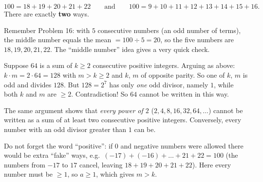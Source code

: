 {
\[100=18+19+20+21+22\qquad\text{and}\qquad 100=9+10+11+12+13+14+15+16.\]
There are exactly \textbf{two} ways.

\begin{tipbox}Remember Problem 16: with $5$ consecutive numbers (an odd number of terms), the middle number equals the mean $=100\div 5=20$, so the five numbers are $18,19,20,21,22$. The ``middle number'' idea gives a very quick check.\end{tipbox}

Suppose $64$ is a sum of $k\ge 2$ consecutive positive integers. Arguing as above: $k\cdot m=2\cdot 64=128$ with $m>k\ge 2$ and $k$, $m$ of opposite parity. So one of $k$, $m$ is odd and divides $128$. But $128=2^7$ has only \emph{one} odd divisor, namely $1$, while both $k$ and $m$ are $\ge 2$. Contradiction! So $64$ cannot be written in this way.

\begin{proofbox}The same argument shows that \emph{every power of $2$} ($2,4,8,16,32,64,\dots$) cannot be written as a sum of at least two consecutive positive integers. Conversely, every number with an odd divisor greater than $1$ can be.\end{proofbox}

\begin{warnbox}Do not forget the word ``positive'': if $0$ and negative numbers were allowed there would be extra ``fake'' ways, e.g.\ $(-17)+(-16)+\dots+21+22=100$ (the numbers from $-17$ to $17$ cancel, leaving $18+19+20+21+22$). Here every number must be $\ge 1$, so $a\ge 1$, which gives $m>k$.\end{warnbox}

}

